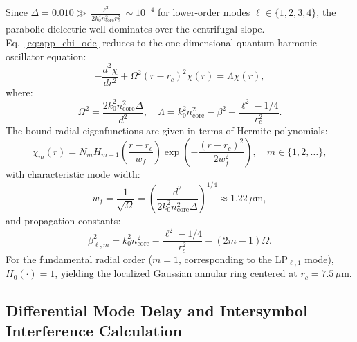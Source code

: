 \documentclass[11pt,a4paper]{article}
\begin{document}
Since $\Delta = 0.010 \gg \frac{\ell^2}{2 k_0^2 n_{\text{core}}^2 r_c^2} \sim 10^{-4}$ for lower-order modes $\ell \in \{1, 2, 3, 4\}$, the parabolic dielectric well dominates over the centrifugal slope. Eq.~\eqref{eq:app_chi_ode} reduces to the one-dimensional quantum harmonic oscillator equation:
\begin{equation}
- \frac{d^2 \chi}{dr^2} + \Omega^2 (r - r_c)^2 \chi(r) = \Lambda \chi(r),
\label{eq:app_harmonic_oscillator}
\end{equation}
where:
\begin{equation}
\Omega^2 = \frac{2 k_0^2 n_{\text{core}}^2 \Delta}{d^2}, \quad \Lambda = k_0^2 n_{\text{core}}^2 - \beta^2 - \frac{\ell^2 - 1/4}{r_c^2}.
\label{eq:app_omega_lambda}
\end{equation}
The bound radial eigenfunctions are given in terms of Hermite polynomials:
\begin{equation}
\chi_m(r) = N_m H_{m-1}\left( \frac{r - r_c}{w_f} \right) \exp\left( - \frac{(r - r_c)^2}{2 w_f^2} \right), \quad m \in \{1, 2, \dots\},
\label{eq:app_hermite_modes}
\end{equation}
with characteristic mode width:
\begin{equation}
w_f = \frac{1}{\sqrt{\Omega}} = \left( \frac{d^2}{2 k_0^2 n_{\text{core}}^2 \Delta} \right)^{1/4} \approx 1.22\,\mu\text{m},
\label{eq:app_wf_exact}
\end{equation}
and propagation constants:
\begin{equation}
\beta_{\ell, m}^2 = k_0^2 n_{\text{core}}^2 - \frac{\ell^2 - 1/4}{r_c^2} - (2m - 1) \Omega.
\label{eq:app_beta_eigenvalues}
\end{equation}
For the fundamental radial order ($m=1$, corresponding to the LP$_{\ell, 1}$ mode), $H_0(\cdot) = 1$, yielding the localized Gaussian annular ring centered at $r_c = 7.5\,\mu\text{m}$.

\subsection{Differential Mode Delay and Intersymbol Interference Calculation}
\end{document}
